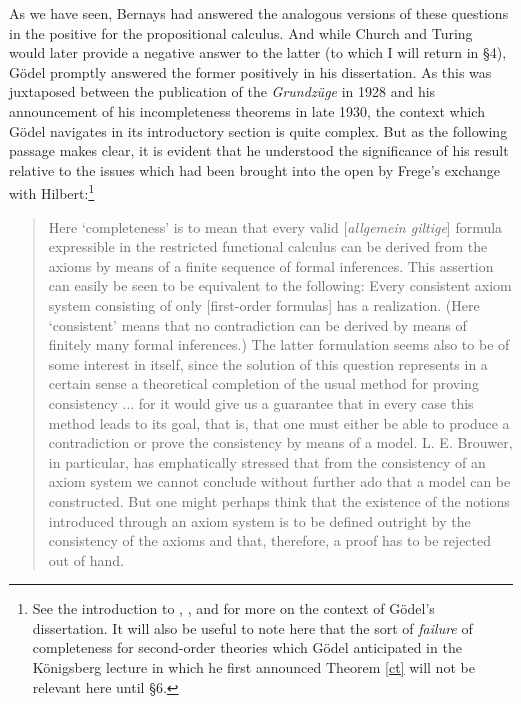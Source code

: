 \documentclass[11pt,fleqn,leqno]{article}
\begin{document}
As we have seen, Bernays had answered the analogous versions of these questions in the positive for the propositional calculus.   And while Church and Turing would later provide a negative answer to the latter (to which I will return in \S 4), G\"odel promptly answered the former positively in his dissertation.  As this was juxtaposed between the publication of the \textsl{Grundz\"uge} in 1928 and his announcement of his incompleteness theorems in late 1930, the context which G\"odel navigates in its introductory section is quite complex.   But as the following passage makes clear,  it is evident that he understood the significance of his result relative to the issues which had been brought into the open by Frege's exchange with Hilbert:\footnote{See the introduction to \citep{Godel1929a}, \citep{Kennedy2011a}, and \citep[\S 4.2]{Baldwin2018} for more on the context of G\"odel's dissertation.  It will also be useful to note here that the sort of \textsl{failure} of completeness for second-order theories which G\"odel anticipated in the K\"onigsberg lecture in which he first announced Theorem \ref{ct} will not be relevant here until \S 6.}

{\footnotesize
\begin{quote}
Here `completeness' is to mean that every valid [\textsl{allgemein giltige}] formula expressible in the restricted functional calculus can be derived from the axioms by means of a finite sequence of formal inferences. This assertion can easily be seen to be equivalent to the following: Every consistent axiom system consisting of only [first-order formulas] has a realization.   (Here `consistent' means that no contradiction can be derived by means of finitely many formal inferences.) The latter formulation seems also to be of some interest in itself, since the solution of this question represents in a certain sense a theoretical completion of the usual method for proving consistency $\ldots$ for it would give us a guarantee that in every case this method leads to its goal, that is, that one must either be able to produce a contradiction or prove the consistency by means of a model.  L. E. Brouwer, in particular, has emphatically stressed that from the consistency of an axiom system we cannot conclude without further ado that a model can be constructed. But one might perhaps think that the existence of the notions introduced through an axiom system is to be defined outright by the consistency of the axioms and that, therefore, a proof has to be rejected out of hand. \hfill \citep[p. 61]{Godel1929a}
\end{quote}
}
\end{document}
